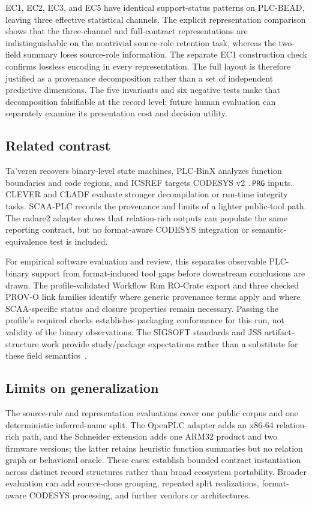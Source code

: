 \documentclass[a4paper,fleqn]{cas-dc}
\begin{document}
EC1, EC2, EC3, and EC5 have identical support-status patterns on PLC-BEAD, leaving three effective statistical channels. The explicit representation comparison shows that the three-channel and full-contract representations are indistinguishable on the nontrivial source-role retention task, whereas the two-field summary loses source-role information. The separate EC1 construction check confirms lossless encoding in every representation. The full layout is therefore justified as a provenance decomposition rather than a set of independent predictive dimensions. The five invariants and six negative tests make that decomposition falsifiable at the record level; future human evaluation can separately examine its presentation cost and decision utility.

\subsection{Related contrast}

Ta'veren recovers binary-level state machines, PLC-BinX analyzes function boundaries and code regions, and ICSREF targets CODESYS v2 \texttt{.PRG} inputs. CLEVER and CLADF evaluate stronger decompilation or run-time integrity tasks. SCAA-PLC records the provenance and limits of a lighter public-tool path. The radare2 adapter shows that relation-rich outputs can populate the same reporting contract, but no format-aware CODESYS integration or semantic-equivalence test is included.

For empirical software evaluation and review, this separates observable PLC-binary support from format-induced tool gaps before downstream conclusions are drawn. The profile-validated Workflow Run RO-Crate export and three checked PROV-O link families identify where generic provenance terms apply and where SCAA-specific status and closure properties remain necessary. Passing the profile's required checks establishes packaging conformance for this run, not validity of the binary observations. The SIGSOFT standards and JSS artifact-structure work provide study/package expectations rather than a substitute for these field semantics~\citep{w3c_prov_o2013,leo_workflow_run_rocrate2024,ralph_empirical_standards2021,guevara_vega_research_artifacts2024}.

\subsection{Limits on generalization}

The source-rule and representation evaluations cover one public corpus and one deterministic inferred-name split. The OpenPLC adapter adds an x86-64 relation-rich path, and the Schneider extension adds one ARM32 product and two firmware versions; the latter retains heuristic function summaries but no relation graph or behavioral oracle. These cases establish bounded contract instantiation across distinct record structures rather than broad ecosystem portability. Broader evaluation can add source-clone grouping, repeated split realizations, format-aware CODESYS processing, and further vendors or architectures.
\end{document}
